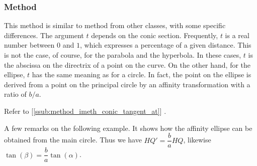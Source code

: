 
\subsubsection{Method } %
\label{ssub:method_imeth_conic_point}

This method is similar to  method  from other classes, with some specific differences. The argument $t$ depends on the conic section. Frequently, $t$ is a real number between $0$ and $1$, which expresses a percentage of a given distance. This is not the case, of course, for the parabola and the hyperbola. In these cases, $t$ is the abscissa on the directrix of a point on the curve. On the other hand, for the ellipse, $t$ has the same meaning as for a circle. In fact, the point on the ellipse is derived from a point on the principal circle by an affinity transformation with a ratio of $b/a$.

Refer to [\ref{ssub:method_imeth_conic_tangent_at}] .

A few remarks on the following example. It shows how the affinity ellipse can be obtained from the main circle. Thus we have $HQ' = \dfrac{b}{a} HQ$, likewise $\tan(\beta) = \dfrac{b}{a} \tan(\alpha)$.


